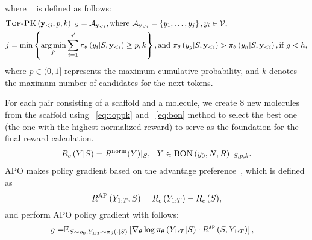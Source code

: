 \noindent where \TOPPK~\citep{liu2024erp} is defined as follows:
\begin{align}\label{eq:toppk}
    &\text{\textsc{Top-PK}} \left( {\mathbf{y}_{<i}, p,k} \right) |_{S}= \mathcal{A}_{\mathbf{y}_{<i}}, 
   \text{where~} \mathcal{A}_{\mathbf{y}_{<i}}=\left\{y_1,\ldots,y_{j}\right\}, y_i\in \mathcal{V},  \\ 
    & j= \min \left\{\mathop{\rm arg\,min}_{j'}\sum_{i=1}^{j'}\pi_{\theta} \left( {y_i|S,\mathbf{y}_{<i}} \right)  \geq p, k\right\},
    \text{and } \pi_{\theta} \left( {y_g|S,\mathbf{y}_{<i}} \right) >\pi_{\theta} \left( {y_h|S,\mathbf{y}_{<i}} \right) , \text{if } g<h, \notag
\end{align}
where $p\in (0,1]$ represents the maximum cumulative probability, and $k$ denotes the maximum number of candidates for the next tokens.
































For each pair consisting of a scaffold and a molecule, we create 8 new molecules from the scaffold using \TOPPK~\eqref{eq:toppk}  and \BON~\eqref{eq:bon} method to select the best one (the one with the highest normalized reward) to serve as the foundation for the final reward calculation.
\begin{align}\label{eq:reward}
{R_c\ensuremath{ \left( {Y|S} \right) }}= R^{\text{norm}}{ \left( {Y} \right) }|_{S}, ~~{Y} \in \text{{{BON}}} \left( {y_0,N,R} \right) |_{S,p,k}.
\end{align}
APO makes policy gradient based on the advantage preference~\citep{liu2023drugimprover}, which is defined as
\begin{equation}\label{eq:advantage_preference}
R^\text{AP} \left( {Y_{1:T},S} \right)  ={R_c \left( {Y_{1:T}} \right)  - R_c \left( {S} \right) },
\end{equation}
and perform APO policy gradient with follows:
\begin{align}\label{eq:adv:preference}
     {g}=& \textstyle \mathbb{E}_{S\sim {\rho_0},{Y_{1:T}\sim \pi_{{\theta}} \left( {\cdot|S} \right) } } 
     \left[ \nabla_{\theta}\log \pi_{{\theta}} \left( {Y_{1:T}|S} \right) 
     \cdot R^{\mathtt{AP}} \left( {S,Y_{1:T}} \right) \right],
\end{align}
